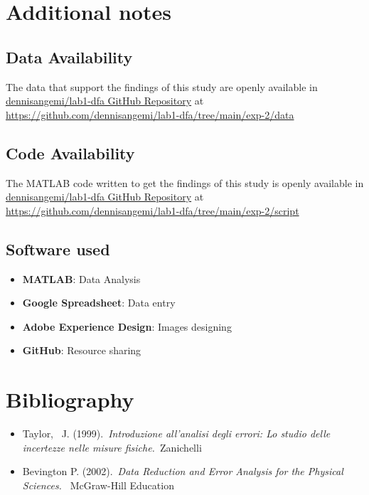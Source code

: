 \documentclass[10pt,a4paper]{article}
\begin{document}
\section{Additional notes}

\subsection{Data Availability}
The data that support the findings of this study are openly available in \href{https://github.com/dennisangemi/lab1-dfa/tree/main/exp-2/data}{dennisangemi/lab1-dfa GitHub Repository} at \href{https://github.com/dennisangemi/lab1-dfa/tree/main/exp-2/data}{https://github.com/dennisangemi/lab1-dfa/tree/main/exp-2/data}

\subsection{Code Availability}
The MATLAB code written to get the findings of this study is openly available in \href{https://github.com/dennisangemi/lab1-dfa/tree/main/exp-2/script}{dennisangemi/lab1-dfa GitHub Repository} at \href{https://github.com/dennisangemi/lab1-dfa/tree/main/exp-2/script}{https://github.com/dennisangemi/lab1-dfa/tree/main/exp-2/script}


\subsection{Software used}
\begin{itemize}
\item
  \textbf{MATLAB}: Data Analysis
\item
  \textbf{Google Spreadsheet}: Data entry
\item
  \textbf{Adobe Experience Design}: Images designing
\item
  \textbf{GitHub}: Resource sharing
\end{itemize}

\section{Bibliography}
\begin{itemize}
\item
  Taylor,~ J. (1999).~\emph{Introduzione all'analisi degli errori: Lo
  studio delle incertezze nelle misure fisiche.~}Zanichelli
\item
  Bevington P. (2002).~\emph{Data Reduction and Error Analysis for the
  Physical Sciences.~} McGraw-Hill Education ~
\end{itemize}
\end{document}
